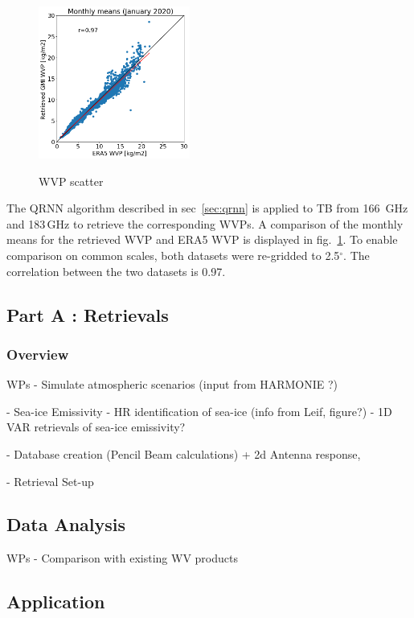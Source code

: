 \documentclass[12pt,oneside,a4paper]{article}
\begin{document}
\begin{figure}[t]
	\centering
	\caption{WVP scatter}
	\includegraphics[height = 50mm]{Figures/WVP_scatter_monthlymean.png} 
	\label{fig:wvp_scatter}
\end{figure}

The QRNN algorithm described in sec~\ref{sec:qrnn} is applied to TB from 166 \,GHz and 183\,GHz to retrieve the corresponding WVPs. A comparison of the monthly means for the retrieved WVP and ERA5 WVP is displayed in fig.~\ref{fig:wvp_scatter}. To enable comparison on common scales, both datasets were re-gridded to 2.5$^{\circ}$. The correlation between the two datasets is 0.97. 


\subsection{Part A : Retrievals}

\subsubsection{Overview}


WPs - Simulate atmospheric scenarios (input from HARMONIE ?)

	- Sea-ice Emissivity 
		- HR identification of sea-ice 	(info from Leif, figure?)
		- 1D VAR retrievals of sea-ice emissivity?  
	

	
	- Database creation (Pencil Beam calculations) +  2d Antenna response, 
	
	- Retrieval Set-up 
	
 
\subsection{Data Analysis}

WPs  - Comparison with existing WV products


\subsection{Application}
\end{document}
